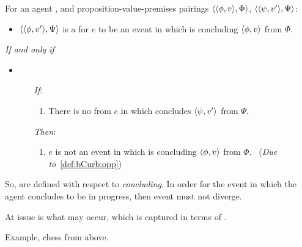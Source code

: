 \begin{note}
  \begin{definition}[A \bCurb{0}]
    \label{def:bCurb}
    For an agent \vAgent{}, and proposition-value-premises pairings \(\langle \langle \phi, v \rangle, \Phi \rangle\), \(\langle \langle \psi, v' \rangle, \Psi \rangle\):

    \begin{itemize}
    \item
      \(\langle \langle \phi, v' \rangle, \Psi \rangle\) is a \emph{\bCurb{}} for \(e\) to be an event in which \vAgent{} is concluding \(\langle \phi, v \rangle\) from \(\Phi\).
    \end{itemize}

    \emph{If and only if}

    \begin{itemize}
    \item
        \begin{enumerate}
        \item[\emph{If}:]
          \begin{enumerate}[label=\alph*., ref=(\alph*)]
          \item
            \label{def:bCurb:opp}
            There is no \pevent{} from \(e\) in which \vAgent{} concludes \(\langle \psi, v' \rangle\) from \(\Psi\).
          \end{enumerate}
        \item[\emph{Then}:]
          \begin{enumerate}[label=\alph*., ref=(\alph*), resume]
          \item
            \label{def:bCurb:fail}
            \(e\) is not an event in which \vAgent{} is concluding \(\langle \phi, v \rangle\) from \(\Phi\).\newline
            \mbox{ }\hfill(\emph{Due to}~\ref{def:bCurb:opp})
          \end{enumerate}
      \end{enumerate}
    \end{itemize}
    \vspace{-\baselineskip}
  \end{definition}

  So,  are defined with respect to \emph{concluding}.
  In order for the event in which the agent concludes to be in progress, then event must not diverge.

  At issue is what may occur, which is captured in terms of .
\end{note}

\begin{note}
  Example, chess from above.
\end{note}

